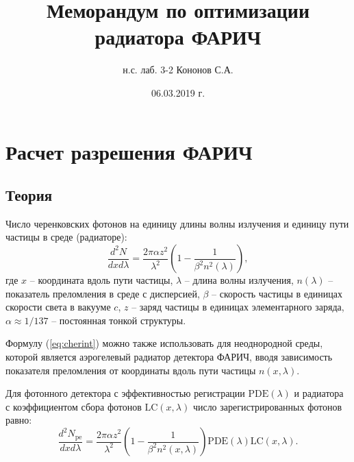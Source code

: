 \documentclass[12pt]{article}
\title{\Large\bf Меморандум по оптимизации радиатора ФАРИЧ}
\author{\large н.с. лаб. 3-2 Кононов С.А.}
\date{\large 06.03.2019 г.}
\begin{document}
\maketitle

\section{Расчет разрешения ФАРИЧ}
\subsection{Теория}
Число черенковских фотонов на единицу длины волны излучения и единицу пути частицы в среде (радиаторе):
\begin{equation}
\frac{d^2N}{dx d\lambda} = \frac{2\pi\alpha z^2}{\lambda^2}\left(1 - \frac{1}{\beta^2 n^2(\lambda)}\right),
\label{eq:cherint}
\end{equation}
где $x$ -- координата вдоль пути частицы, $\lambda$ -- длина волны излучения,
$n(\lambda)$ -- показатель преломления в среде с дисперсией,
$\beta$ -- скорость частицы в единицах скорости света в вакууме $c$, $z$ -- заряд частицы в единицах элементарного заряда, 
$\alpha\approx 1/137$ -- постоянная тонкой структуры.

Формулу (\ref{eq:cherint}) можно также использовать для неоднородной среды, которой является аэрогелевый радиатор детектора ФАРИЧ, вводя
зависимость показателя преломления от координаты вдоль пути частицы $n(x,\lambda)$.

Для фотонного детектора с эффективностью регистрации $\mathrm{PDE}(\lambda)$ и радиатора с коэффициентом сбора 
фотонов $\mathrm{LC}(x,\lambda)$ число зарегистрированных фотонов равно:
\begin{equation}
\frac{d^2N_\mathrm{pe}}{dx d\lambda} = \frac{2\pi\alpha z^2}{\lambda^2}\left(1 - \frac{1}{\beta^2 n^2(x,\lambda)}\right)
\mathrm{PDE}(\lambda)\mathrm{LC}(x,\lambda).
\label{eq:cherintdet}
\end{equation}
\end{document}

